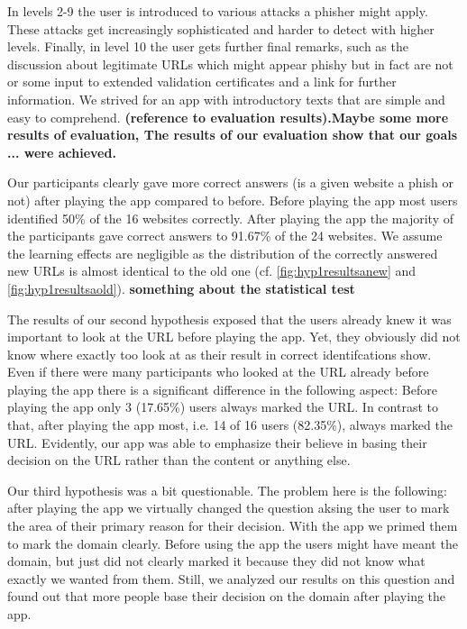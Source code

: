 In levels 2-9 the user is introduced to various attacks a phisher might apply.
These attacks get increasingly sophisticated and harder to detect with higher levels.
Finally, in level 10 the user gets further final remarks, such as the discussion about legitimate URLs which might appear phishy but in fact are not or some input to extended validation certificates and a link for further information.
We strived for an app with introductory texts that are simple and easy to comprehend.
\textbf{(reference to evaluation results).Maybe some more results of evaluation, The results of our evaluation show that our goals ... were achieved.}

Our participants clearly gave more correct answers (is a given website a phish or not) after playing the app compared to before.
Before playing the app most users identified 50\% of the 16 websites correctly.
After playing the app the majority of the participants gave correct answers to 91.67\% of the 24 websites.
We assume the learning effects are negligible as the distribution of the correctly answered new URLs is almost identical to the old one (cf. \autoref{fig:hyp1resultsanew} and \autoref{fig:hyp1resultsaold}).
\textbf{something about the statistical test}

The results of our second hypothesis exposed that the users already knew it was important to look at the URL before playing the app.
Yet, they obviously did not know where exactly too look at as their result in correct identifcations show.
Even if there were many participants who looked at the URL already before playing the app there is a significant difference in the following aspect:
Before playing the app only 3 (17.65\%) users always marked the URL.
In contrast to that, after playing the app most, i.e. 14 of 16 users (82.35\%), always marked the URL.
Evidently, our app was able to emphasize their believe in basing their decision on the URL rather than the content or anything else.

Our third hypothesis was a bit questionable.
The problem here is the following: after playing the app we virtually changed the question aksing the user to mark the area of their primary reason for their decision.
With the app we primed them to mark the domain clearly.
Before using the app the users might have meant the domain, but just did not clearly marked it because they did not know what exactly we wanted from them.
Still, we analyzed our results on this question and found out that more people base their decision on the domain after playing the app.

